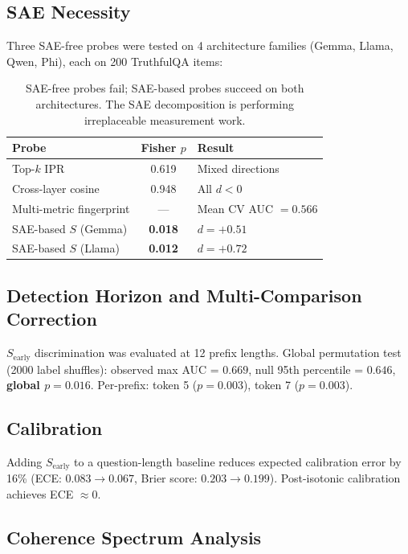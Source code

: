 \documentclass{article}
\begin{document}
\subsection{SAE Necessity}

Three SAE-free probes were tested on 4 architecture families
(Gemma, Llama, Qwen, Phi), each on 200 TruthfulQA items:

\begin{table}[h]
\centering
\small
\begin{tabular}{lcl}
\toprule
Probe & Fisher $p$ & Result \\
\midrule
Top-$k$ IPR & 0.619 & Mixed directions \\
Cross-layer cosine & 0.948 & All $d < 0$ \\
Multi-metric fingerprint & --- & Mean CV AUC $= 0.566$ \\
\midrule
SAE-based $S$ (Gemma) & \textbf{0.018} & $d = +0.51$ \\
SAE-based $S$ (Llama) & \textbf{0.012} & $d = +0.72$ \\
\bottomrule
\end{tabular}
\caption{SAE-free probes fail; SAE-based probes succeed on both
architectures. The SAE decomposition is performing irreplaceable
measurement work.}
\label{tab:saenecessity}
\end{table}

\subsection{Detection Horizon and Multi-Comparison Correction}

$S_\text{early}$ discrimination was evaluated at 12 prefix lengths.
Global permutation test (2000 label shuffles): observed max AUC =
$0.669$, null 95th percentile = $0.646$, \textbf{global $p = 0.016$}.
Per-prefix: token 5 ($p = 0.003$), token 7 ($p = 0.003$).

\subsection{Calibration}

Adding $S_\text{early}$ to a question-length baseline reduces expected
calibration error by 16\% (ECE: $0.083 \rightarrow 0.067$, Brier
score: $0.203 \rightarrow 0.199$). Post-isotonic calibration achieves
ECE $\approx 0$.

\subsection{Coherence Spectrum Analysis}
\label{sec:spectrum}
\end{document}
